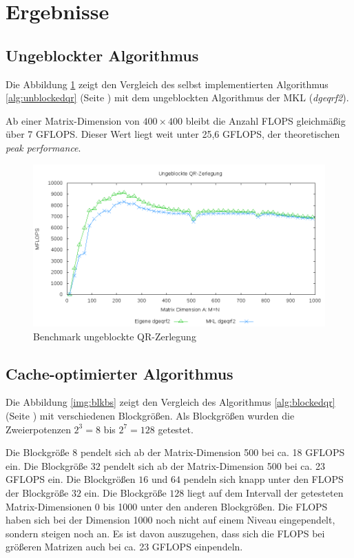 \newpage
\section{Ergebnisse}
\subsection{Ungeblockter Algorithmus}
Die Abbildung \ref{img:unblk} zeigt den Vergleich des selbst implementierten Algorithmus \ref{alg:unblockedqr} (Seite \pageref{alg:unblockedqr}) mit dem ungeblockten Algorithmus der MKL (\textit{dgeqrf2}).

Ab einer Matrix-Dimension von $400 \times 400$ bleibt die Anzahl FLOPS gleichmäßig über 7 GFLOPS. Dieser Wert liegt weit unter 25,6 GFLOPS, der theoretischen \textit{peak performance}. 




\begin{figure}[H]
	\includegraphics[width=\textwidth]{images/unblk.png}
	\caption{Benchmark ungeblockte QR-Zerlegung}
	\label{img:unblk}
\end{figure}


\newpage
\subsection{Cache-optimierter Algorithmus}

Die Abbildung \ref{img:blkbs} zeigt den Vergleich des Algorithmus \ref{alg:blockedqr} (Seite \pageref{alg:blockedqr}) mit verschiedenen Blockgrößen.
Als Blockgrößen wurden die Zweierpotenzen $2^3 = 8$ bis $2^7 = 128$ getestet.

Die Blockgröße $8$ pendelt sich ab der Matrix-Dimension 500 bei ca. 18 GFLOPS ein. 
Die Blockgröße $32$ pendelt sich ab der Matrix-Dimension 500 bei ca. 23 GFLOPS ein.
Die Blockgrößen $16$ und $64$ pendeln sich knapp unter den FLOPS der Blockgröße $32 $ ein.
Die Blockgröße $128$ liegt auf dem Intervall der getesteten Matrix-Dimensionen 0 bis 1000 unter den anderen Blockgrößen. Die FLOPS haben sich bei der Dimension 1000 noch nicht auf einem Niveau eingependelt, sondern steigen noch an. Es ist davon auszugehen, dass sich die FLOPS bei größeren Matrizen auch bei  ca. 23 GFLOPS einpendeln.

